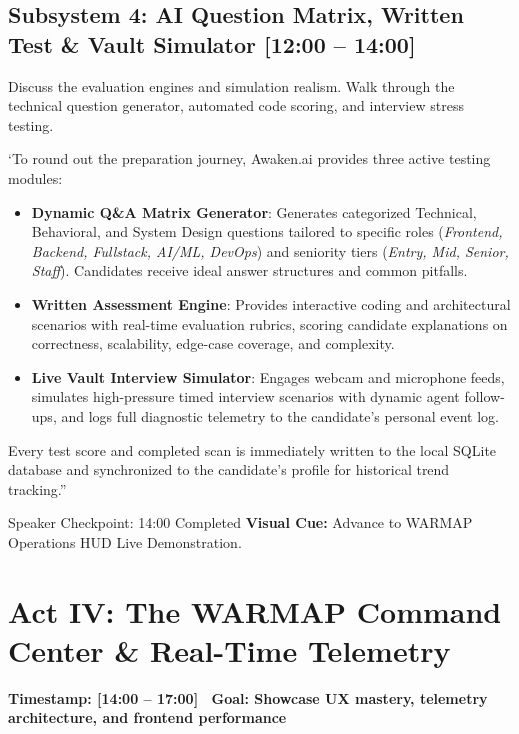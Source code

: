 \documentclass[11pt,a4paper]{article}
\begin{document}
\subsection{Subsystem 4: AI Question Matrix, Written Test \& Vault Simulator [12:00 -- 14:00]}

\begin{speakercue}{Discuss the evaluation engines and simulation realism.}
Walk through the technical question generator, automated code scoring, and interview stress testing.
\end{speakercue}

`To round out the preparation journey, Awaken.ai provides three active testing modules:

\begin{itemize}[leftmargin=*]
    \item \textbf{Dynamic Q\&A Matrix Generator}: Generates categorized Technical, Behavioral, and System Design questions tailored to specific roles (\textit{Frontend, Backend, Fullstack, AI/ML, DevOps}) and seniority tiers (\textit{Entry, Mid, Senior, Staff}). Candidates receive ideal answer structures and common pitfalls.
    \item \textbf{Written Assessment Engine}: Provides interactive coding and architectural scenarios with real-time evaluation rubrics, scoring candidate explanations on correctness, scalability, edge-case coverage, and complexity.
    \item \textbf{Live Vault Interview Simulator}: Engages webcam and microphone feeds, simulates high-pressure timed interview scenarios with dynamic agent follow-ups, and logs full diagnostic telemetry to the candidate's personal event log.
\end{itemize}

Every test score and completed scan is immediately written to the local SQLite database and synchronized to the candidate's profile for historical trend tracking.''

\begin{timingbox}{Speaker Checkpoint: 14:00 Completed}
\textbf{Visual Cue:} Advance to WARMAP Operations HUD Live Demonstration.
\end{timingbox}

\newpage

\section{Act IV: The WARMAP Command Center \& Real-Time Telemetry}
\textcolor{accentyellow}{\textbf{Timestamp: [14:00 -- 17:00] \textbar\ Goal: Showcase UX mastery, telemetry architecture, and frontend performance}}
\end{document}
